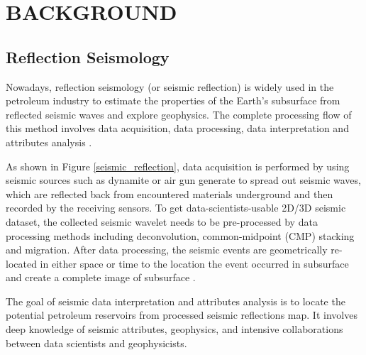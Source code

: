%
%
%

\chapter{\uppercase{Background}}

\section{Reflection Seismology}

Nowadays, reflection seismology (or seismic reflection) is widely used in the petroleum industry to estimate the properties of the Earth's subsurface from reflected seismic waves and explore geophysics. The complete processing flow of this method involves data acquisition, data processing, data interpretation and attributes analysis \cite{seisreflectionwiki}. 

As shown in Figure \ref{seismic_reflection}, data acquisition is performed by using seismic sources such as dynamite or air gun generate to spread out seismic waves, which are reflected back from encountered materials underground and then recorded by the receiving sensors. To get data-scientists-usable 2D/3D seismic dataset, the collected seismic wavelet needs to be pre-processed by data processing methods including deconvolution, common-midpoint (CMP) stacking and migration. After data processing, the seismic events are geometrically re-located in either space or time to the location the event occurred in subsurface and create a complete image of subsurface \cite{seisreflectionwiki}. 

The goal of seismic data interpretation and  attributes analysis is to locate the potential petroleum reservoirs from processed seismic reflections map. It involves deep knowledge of seismic attributes, geophysics, and intensive collaborations between data scientists and geophysicists.   

